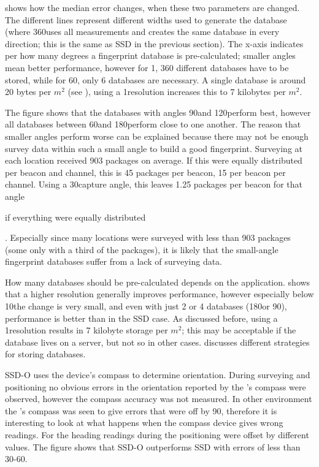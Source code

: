  shows how the median error changes, when these two parameters are changed.
The different lines represent different widths used to generate the database (where 360\textdegree uses all measurements and creates the same database in every direction; this is the same as SSD in the previous section).
The x-axis indicates per how many degrees a fingerprint database is pre-calculated; smaller angles mean better performance, however for 1\textdegree, 360 different databases have to be stored, while for 60\textdegree, only 6 databases are necessary.
A single database is around 20 bytes per $m^2$ (see ), using a 1\textdegree resolution increases this to 7 kilobytes per $m^2$.

The figure shows that the databases with angles 90\textdegree and 120\textdegree perform best, however all databases between 60\textdegree and 180\textdegree perform close to one another.
The reason that smaller angles perform worse can be explained because there may not be enough survey data within such a small angle to build a good fingerprint.
Surveying at each location received 903 packages on average.
If this were equally distributed per beacon and channel, this is 45 packages per beacon, 15 per beacon per channel.
Using a 30\textdegree capture angle, this leaves 1.25 packages per beacon for that angle \begin{em}if everything were equally distributed\end{em}.
Especially since many locations were surveyed with less than 903 packages (some only with a third of the packages), it is likely that the small-angle fingerprint databases suffer from a lack of surveying data.

How many databases should be pre-calculated depends on the application.
 shows that a higher resolution generally improves performance, however especially below 10\textdegree the change is very small, and even with just 2 or 4 databases (180\textdegree or 90\textdegree), performance is better than in the SSD case.
As discussed before, using a 1\textdegree resolution results in 7 kilobyte storage per $m^2$; this may be acceptable if the database lives on a server, but not so in other cases.
 discusses different strategies for storing databases.

SSD-O uses the device's compass to determine orientation.
During surveying and positioning no obvious errors in the orientation reported by the \device's compass were observed, however the compass accuracy was not measured.
In other environment the \device's compass was seen to give errors that were off by 90\textdegree, therefore it is interesting to look at what happens when the compass device gives wrong readings.
For  the heading readings during the positioning were offset by different values.
The figure shows that SSD-O outperforms SSD with errors of less than 30-60\textdegree.

